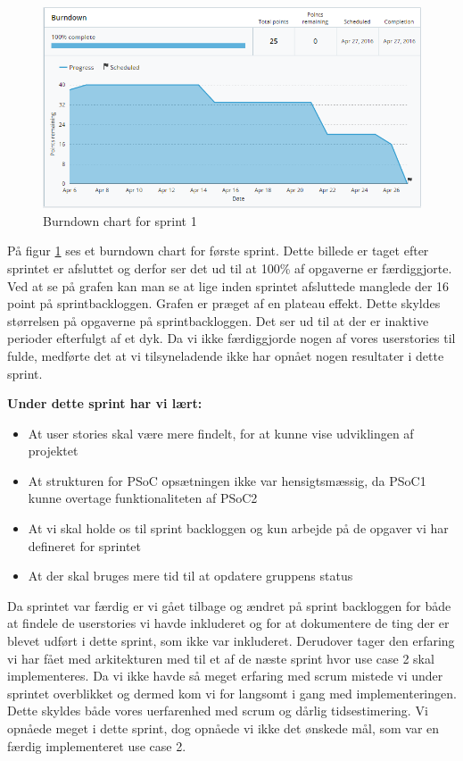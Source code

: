 	\begin{figure}[H]
		\centering
		\includegraphics[width=\textwidth]{Projektgennemfoerelse/images/burndown1}
		\caption{Burndown chart for sprint 1}
		\label{ref:Burndown1}
	\end{figure}
	
	På figur \ref{ref:Burndown1} ses et burndown chart for første sprint. Dette billede er taget efter sprintet er afsluttet og derfor ser det ud til at 100\% af opgaverne er færdiggjorte. Ved at se på grafen kan man se at lige  inden sprintet afsluttede manglede der 16 point på sprintbackloggen. Grafen er præget af en plateau effekt. Dette skyldes størrelsen på opgaverne på sprintbackloggen. Det ser ud til at der er inaktive perioder efterfulgt af et dyk. Da vi ikke færdiggjorde nogen af vores userstories til fulde, medførte det at vi tilsyneladende ikke har opnået nogen resultater i dette sprint.  \newline
	
	\textbf{Under dette sprint har vi lært:}
	\begin{itemize}
		\item At user stories skal være mere findelt, for at kunne vise udviklingen af projektet
		\item At strukturen for PSoC opsætningen ikke var hensigtsmæssig, da PSoC1 kunne overtage funktionaliteten af PSoC2
		\item At vi skal holde os til sprint backloggen og kun arbejde på de opgaver vi har defineret for sprintet
		\item At der skal bruges mere tid til at opdatere gruppens status
	\end{itemize}
	
	Da sprintet var færdig er vi gået tilbage og ændret på sprint backloggen for både at findele de userstories vi havde inkluderet og for at dokumentere de ting der er blevet udført i dette sprint, som ikke var inkluderet. Derudover tager den erfaring vi har fået med arkitekturen med til et af de næste sprint hvor use case 2 skal implementeres. Da vi ikke havde så meget erfaring med scrum mistede vi under sprintet overblikket og dermed kom vi for langsomt i gang med implementeringen. Dette skyldes både vores uerfarenhed med scrum og dårlig tidsestimering. Vi opnåede meget i dette sprint, dog opnåede vi ikke det ønskede mål, som var en færdig implementeret use case 2. 
	
